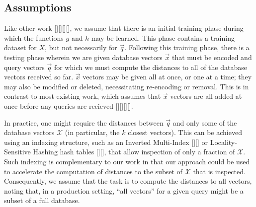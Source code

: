 \subsection{Assumptions}

Like other work [][][][], we assume that there is an initial training phase during which the functions $g$ and $h$ may be learned. This phase contains a training dataset for $X$, but not necessarily for $\vec{q}$. Following this training phase, there is a testing phase wherein we are given database vectors $\vec{x}$ that must be encoded and query vectors $\vec{q}$ for which we must compute the distances to all of the database vectors received so far. $\vec{x}$ vectors may be given all at once, or one at a time; they may also be modified or deleted, necessitating re-encoding or removal. This is in contrast to most existing work, which assumes that $\vec{x}$ vectors are all added at once before any queries are recieved [][][][].

In practice, one might require the distances between $\vec{q}$ and only some of the database vectors $\mathcal{X}$ (in particular, the $k$ closest vectors). This can be achieved using an indexing structure, such as an Inverted Multi-Index [][] or Locality-Sensitive Hashing hash tables [][], that allow inspection of only a fraction of $\mathcal{X}$. Such indexing is complementary to our work in that our approach could be used to accelerate the computation of distances to the subset of $\mathcal{X}$ that is inspected. Consequently, we assume that the task is to compute the distances to all vectors, noting that, in a production setting, ``all vectors'' for a given query might be a subset of a full database.









